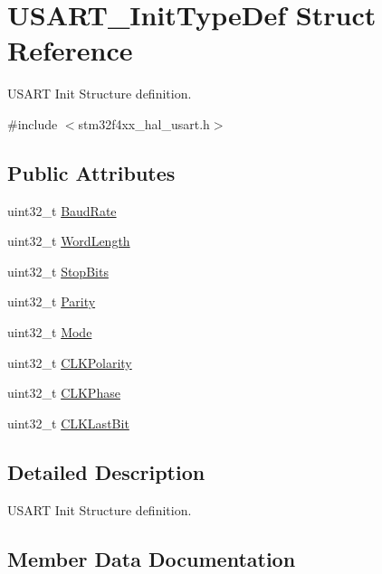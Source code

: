 \hypertarget{struct_u_s_a_r_t___init_type_def}{}\section{U\+S\+A\+R\+T\+\_\+\+Init\+Type\+Def Struct Reference}
\label{struct_u_s_a_r_t___init_type_def}


U\+S\+A\+RT Init Structure definition.  




{\ttfamily \#include $<$stm32f4xx\+\_\+hal\+\_\+usart.\+h$>$}

\subsection*{Public Attributes}
\begin{DoxyCompactItemize}
\item 
uint32\+\_\+t \hyperlink{struct_u_s_a_r_t___init_type_def_adef2ac12c9e2091ba9f511718b30ae50}{Baud\+Rate}
\item 
uint32\+\_\+t \hyperlink{struct_u_s_a_r_t___init_type_def_ac4012d27b28014f60a3ad987c62d4fc7}{Word\+Length}
\item 
uint32\+\_\+t \hyperlink{struct_u_s_a_r_t___init_type_def_a1d8f4c07fa88a7e4b50c403b391e5fe5}{Stop\+Bits}
\item 
uint32\+\_\+t \hyperlink{struct_u_s_a_r_t___init_type_def_a87eb81cdeb80ee5c3d96aecbe9e75612}{Parity}
\item 
uint32\+\_\+t \hyperlink{struct_u_s_a_r_t___init_type_def_abd7e257f9d24a355ac9f720130d902ca}{Mode}
\item 
uint32\+\_\+t \hyperlink{struct_u_s_a_r_t___init_type_def_afc3f0418628e3eef91593a5122c049d3}{C\+L\+K\+Polarity}
\item 
uint32\+\_\+t \hyperlink{struct_u_s_a_r_t___init_type_def_ac596050ef100502529e0b78696ffbdc1}{C\+L\+K\+Phase}
\item 
uint32\+\_\+t \hyperlink{struct_u_s_a_r_t___init_type_def_a86c0426bafc6c8e67279cbff72ebbe00}{C\+L\+K\+Last\+Bit}
\end{DoxyCompactItemize}


\subsection{Detailed Description}
U\+S\+A\+RT Init Structure definition. 

\subsection{Member Data Documentation}
